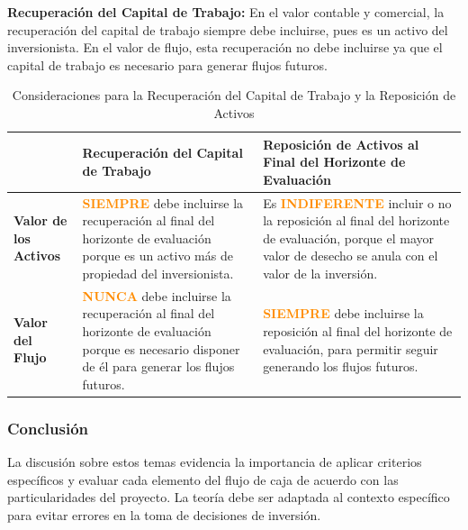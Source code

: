 \documentclass{templateNote}
\begin{document}
\textbf{Recuperación del Capital de Trabajo:}
En el valor contable y comercial, la recuperación del capital de trabajo siempre debe incluirse, pues es un activo del inversionista. En el valor de flujo, esta recuperación no debe incluirse ya que el capital de trabajo es necesario para generar flujos futuros.

\begin{table}[H]
    \centering
    \renewcommand{\arraystretch}{1.5} %
    \begin{tabularx}{\textwidth}{|>{\centering\arraybackslash}X|>{\centering\arraybackslash}X|>{\centering\arraybackslash}X|}
        \hline
        \textbf{} & \textbf{Recuperación del Capital de Trabajo} & \textbf{Reposición de Activos al Final del Horizonte de Evaluación} \\
        \hline
        \textbf{Valor de los Activos} & \textcolor{darkorange}{\textbf{SIEMPRE}} debe incluirse la recuperación al final del horizonte de evaluación porque es un activo más de propiedad del inversionista. & Es \textcolor{darkorange}{\textbf{INDIFERENTE}} incluir o no la reposición al final del horizonte de evaluación, porque el mayor valor de desecho se anula con el valor de la inversión. \\
        \hline
        \textbf{Valor del Flujo} & \textcolor{darkorange}{\textbf{NUNCA}} debe incluirse la recuperación al final del horizonte de evaluación porque es necesario disponer de él para generar los flujos futuros. & \textcolor{darkorange}{\textbf{SIEMPRE}} debe incluirse la reposición al final del horizonte de evaluación, para permitir seguir generando los flujos futuros. \\
        \hline
    \end{tabularx}
    \caption{Consideraciones para la Recuperación del Capital de Trabajo y la Reposición de Activos}
\end{table}

\subsubsection*{Conclusión}
La discusión sobre estos temas evidencia la importancia de aplicar criterios específicos y evaluar cada elemento del flujo de caja de acuerdo con las particularidades del proyecto. La teoría debe ser adaptada al contexto específico para evitar errores en la toma de decisiones de inversión.
\end{document}
